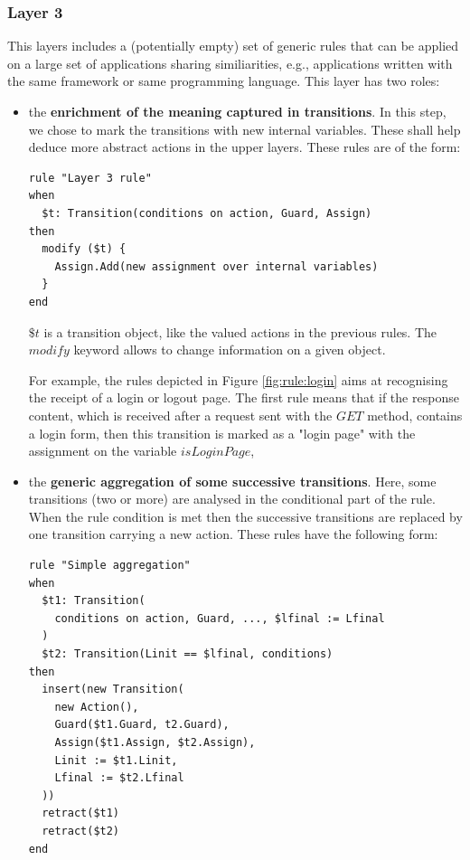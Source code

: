 \subsubsection{Layer 3}

This layers includes a (potentially empty) set of generic rules
that can be applied on a large set of applications sharing
similiarities, e.g., applications written with the same framework
or same programming language.  This layer has two roles:

\begin{itemize}
\item the \textbf{enrichment of the meaning captured in
    transitions}. In this step, we chose to mark the transitions
    with new internal variables. These shall help deduce more
    abstract actions in the upper layers. These rules are of the
    form:

\begin{BVerbatim}
rule "Layer 3 rule"
when
  $t: Transition(conditions on action, Guard, Assign)
then
  modify ($t) {
    Assign.Add(new assignment over internal variables)
  }
end
\end{BVerbatim}

$\$t$ is a transition object, like the valued actions in the
previous rules. The $modify$ keyword allows to change information
on a given object.

For example, the rules depicted in Figure \ref{fig:rule:login}
aims at recognising the receipt of a login or logout page. The
first rule means that if the response content, which is received
after a request sent with the $GET$ method, contains a login
form, then this transition is marked as a "login page" with the
assignment on the variable $isLoginPage$,

\item the \textbf{generic aggregation of some successive
    transitions}. Here, some transitions (two or more) are
    analysed in the conditional part of the rule. When the rule
    condition is met then the successive transitions are replaced
    by one transition carrying a new action. These rules have the
    following form:


\begin{verbatim}
rule "Simple aggregation"
when
  $t1: Transition(
    conditions on action, Guard, ..., $lfinal := Lfinal
  )
  $t2: Transition(Linit == $lfinal, conditions)
then
  insert(new Transition(
    new Action(),
    Guard($t1.Guard, t2.Guard),
    Assign($t1.Assign, $t2.Assign),
    Linit := $t1.Linit,
    Lfinal := $t2.Lfinal
  ))
  retract($t1)
  retract($t2)
end
\end{verbatim}


\end{itemize}
